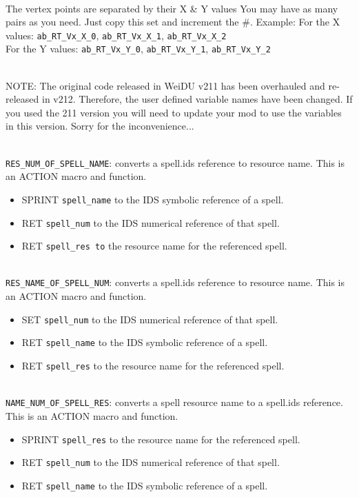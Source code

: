 \documentclass{article}
\begin{document}
\\
The vertex points are separated by their X & Y values
You may have as many pairs as you need. Just copy this set and increment the #.
Example: For the X values: \verb+ab_RT_Vx_X_0+, \verb+ab_RT_Vx_X_1+, \verb+ab_RT_Vx_X_2+\\
         For the Y values: \verb+ab_RT_Vx_Y_0+, \verb+ab_RT_Vx_Y_1+, \verb+ab_RT_Vx_Y_2+

\\
NOTE: The original code released in WeiDU v211 has been overhauled and re-released in v212. Therefore, the user defined variable names have been changed. If you used the 211 version you will need to update your mod to use the variables in this version. Sorry for the inconvenience...


\\
\verb+RES_NUM_OF_SPELL_NAME+: converts a spell.ids reference to resource name.
This is an ACTION macro and function.
\begin{itemize}
\item SPRINT \verb+spell_name+ to the IDS symbolic reference of a spell.
\item RET \verb+spell_num+ to the IDS numerical reference of that spell.
\item RET \verb+spell_res to+ the resource name for the referenced spell.
\end{itemize}
\\

\verb+RES_NAME_OF_SPELL_NUM+: converts a spell.ids reference to resource name.
This is an ACTION macro and function.
\begin{itemize}
\item SET \verb+spell_num+ to the IDS numerical reference of that spell.
\item RET \verb+spell_name+ to the IDS symbolic reference of a spell.
\item RET \verb+spell_res+ to the resource name for the referenced spell.
\end{itemize}
\\

\verb+NAME_NUM_OF_SPELL_RES+: converts a spell resource name to a spell.ids reference.
This is an ACTION macro and function.
\begin{itemize}
\item SPRINT \verb+spell_res+ to the resource name for the referenced spell.
\item RET \verb+spell_num+ to the IDS numerical reference of that spell.
\item RET \verb+spell_name+ to the IDS symbolic reference of a spell.
\end{itemize}
\\
\end{document}
